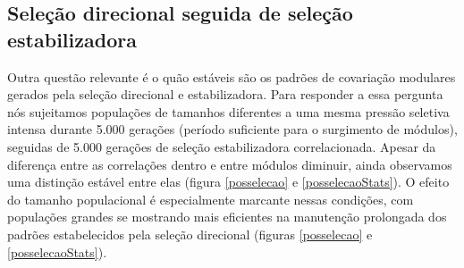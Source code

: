 \subsection{Seleção direcional seguida de seleção estabilizadora}

Outra questão relevante é o quão estáveis são os padrões de covariação
modulares gerados pela seleção direcional e estabilizadora. 
Para responder a essa pergunta nós sujeitamos populações de tamanhos
diferentes a uma mesma pressão seletiva intensa durante 5.000 gerações
(período suficiente para o surgimento de módulos), seguidas de 5.000
gerações de seleção estabilizadora correlacionada. 
Apesar da diferença entre as correlações dentro e entre módulos
diminuir, ainda observamos uma distinção estável entre elas (figura
\ref{posselecao} e \ref{posselecaoStats}). 
O efeito do tamanho populacional é especialmente marcante nessas
condições, com populações grandes se mostrando mais eficientes na
manutenção prolongada dos padrões estabelecidos pela seleção direcional
(figuras \ref{posselecao} e \ref{posselecaoStats}). 



